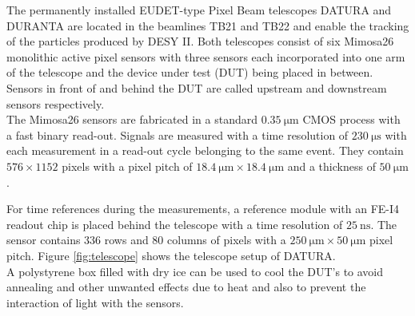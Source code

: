 The permanently installed EUDET-type Pixel Beam telescopes DATURA and DURANTA are located in the beamlines TB21 and TB22 and enable the tracking of the particles
produced by DESY II. Both telescopes consist of six Mimosa26 monolithic active pixel sensors \cite{mimosa26} with %
three sensors each incorporated into one arm of the telescope and the device under test (DUT) being placed in between. Sensors in front of and behind
the DUT are called upstream and downstream sensors respectively.\\
The Mimosa26 sensors are fabricated in a standard $\SI{0.35}{\micro\meter}$ CMOS process with a fast binary read-out.
Signals are measured with a time resolution of $\SI{230}{\micro\second}$ with each measurement in a read-out cycle belonging to the same event.
They contain $576 \times 1152$ pixels with a pixel pitch of $\SI{18.4}{\micro\meter} \times \SI{18.4}{\micro\meter}$
and a thickness of $\SI{50}{\micro\meter}$.

For time references during the measurements, a reference module with an FE-I4 readout chip \cite{fei4} is placed behind the telescope with a
time resolution of $\SI{25}{\nano\second}$. The sensor contains 336 rows and 80 columns of pixels with a
$\SI{250}{\micro\meter} \times \SI{50}{\micro\meter}$ pixel pitch. Figure \ref{fig:telescope} shows the telescope setup of DATURA. \\
A polystyrene box filled with dry ice can be used to cool the DUT's to
avoid annealing and other unwanted effects due to heat and also to prevent the interaction of light with the sensors.


